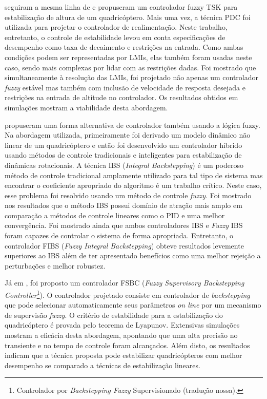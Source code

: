  seguiram a mesma linha de  e propuseram um controlador fuzzy TSK para estabilização de altura de um quadricóptero. Mais uma vez, a técnica PDC foi utilizada para projetar o controlador de realimentação. Neste trabalho, entretanto, o controle de estabilidade levou em conta especificações de desempenho como taxa de decaimento e restrições na entrada. Como ambas condições podem ser representadas por LMIs, elas também foram usadas neste caso, sendo mais complexas por lidar com as restrições dadas. Foi mostrado que simultaneamente à resolução das LMIs, foi projetado não apenas um controlador \textit{fuzzy} estável mas também com inclusão de velocidade de resposta desejada e restrições na entrada de altitude no controlador. Os resultados obtidos em simulações mostram a viabilidade desta abordagem.

 propuseram uma forma alternativa de controlador também usando a lógica fuzzy. Na abordagem utilizada, primeiramente foi derivado um modelo dinâmico não linear de um quadricóptero e então foi desenvolvido um controlador híbrido usando métodos de controle tradicionais e inteligentes para estabilização de dinâmicas rotacionais. A técnica IBS (\textit{Integral Backstepping}) é um poderoso método de controle tradicional amplamente utilizado para tal tipo de sistema mas encontrar o coeficiente apropriado do algoritmo é um trabalho crítico. Neste caso, esse problema foi resolvido usando um método de controle \textit{fuzzy}. Foi mostrado nos resultados que o método IBS possui domínio de atração mais amplo em comparação a métodos de controle lineares como o PID e uma melhor convergência. Foi mostrado ainda que ambos controladores IBS e \textit{Fuzzy} IBS foram capazes de controlar o sistema de forma apropriada. Entretanto, o controlador FIBS (\textit{Fuzzy Integral Backstepping}) obteve resultados levemente superiores ao IBS além de ter apresentado benefícios como uma melhor rejeição a perturbações e melhor robustez.

Já em \cite{Ariffanan2014}, foi proposto um controlador FSBC (\textit{Fuzzy Supervisory Backstepping Controller}\footnote{Controlador por \textit{Backstepping Fuzzy} Supervisionado (tradução nossa).}). O controlador projetado consiste em controlador de \textit{backstepping} que pode selecionar automaticamente seus parâmetros \textit{on line} por um mecanismo de supervisão \textit{fuzzy}. O critério de estabilidade para a estabilização do quadricóptero é provada pelo teorema de Lyapunov. Extensivas simulações mostram a eficácia desta abordagem, apontando que uma alta precisão no transiente e no tempo de controle foram alcançados. Além disto, os resultados indicam que a técnica proposta pode estabilizar quadricópteros com melhor desempenho se comparado a técnicas de estabilização lineares.

